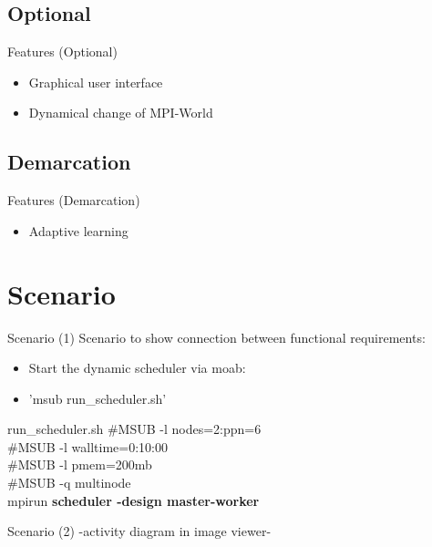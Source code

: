 \documentclass[18pt]{beamer}
\begin{document}
	\subsection{Optional}
	\begin{frame}{Features (Optional)}
		\begin{itemize}
			\pause
			\item Graphical user interface			
			\pause
			\item Dynamical change of MPI-World
		\end{itemize}
	\end{frame}
	
	\subsection{Demarcation}
	\begin{frame}{Features (Demarcation)}
		\begin{itemize}
			\pause
			\item Adaptive learning
		\end{itemize}
	\end{frame}

\section{Scenario}
	\begin{frame}{Scenario (1)}
		Scenario to show connection between functional requirements:
		\pause
		\begin{itemize}
			\item Start the dynamic scheduler via moab:
			\item 'msub run\_scheduler.sh'
		\end{itemize}
		\begin{block}{run\_scheduler.sh}
			\#MSUB -l nodes=2:ppn=6 \\
			\#MSUB -l walltime=0:10:00 \\
			\#MSUB -l pmem=200mb \\
			\#MSUB -q multinode \\
			mpirun \textbf{scheduler -design master-worker}
		\end{block}
	\end{frame}
	\begin{frame}{Scenario (2)}
		\center -activity diagram in image viewer-
	\end{frame}
\end{document}
